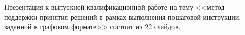 Презентация к выпускной квалификационной работе на тему <<метод поддержки принятия решений в рамках выполнения
пошаговой инструкции, заданной в графовом формате>> состоит из 22 слайдов.
